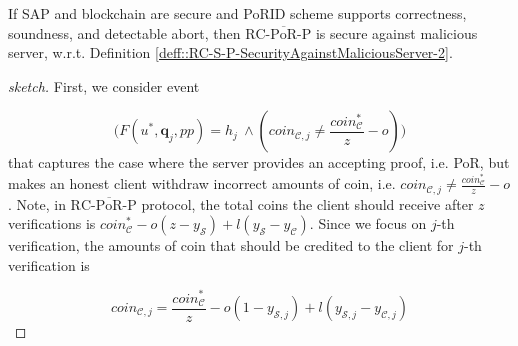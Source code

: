 
 \begin{lemma}
 If SAP and blockchain are secure and  PoRID scheme supports correctness, soundness, and detectable abort, then ${\text{RC-}\overline{\text{PoR}}\text{-P}}$ is secure against malicious server, w.r.t. Definition \ref{deff::RC-S-P-SecurityAgainstMaliciousServer-2}. 
 \end{lemma}
 

 \begin{proof}[sketch]
 First, we  consider event  
 
  $$\Big(F(u^{\scriptscriptstyle *}, \bm{q}_{\scriptscriptstyle j},{pp})= h_{\scriptscriptstyle j}\ \wedge (coin_{\scriptscriptstyle\mathcal{C},j}\neq  \frac{coin_{\scriptscriptstyle\mathcal C}^{\scriptscriptstyle*}}{z}-o)\Big)$$
   that captures the case where the server provides an accepting  proof, i.e. PoR, but makes an honest client withdraw  incorrect amounts of coin, i.e. $coin_{\scriptscriptstyle\mathcal{C},j}\neq  \frac{coin_{\scriptscriptstyle\mathcal C}^{\scriptscriptstyle*}}{z}-o$. Note, in ${\text{RC-}\overline{\text{PoR}}\text{-P}}$ protocol, the total coins the client should receive after $z$ verifications is   $coin^{\scriptscriptstyle *}_{\scriptscriptstyle\mathcal C}-o(z-y_{\scriptscriptstyle\mathcal S})+l(y_{\scriptscriptstyle\mathcal S}-y_{\scriptscriptstyle\mathcal C})$. Since we focus on  $j$-th verification, the amounts of  coin that should be credited to the client for $j$-th verification is
 
 
% 
  
  \begin{equation}\label{equ::what-client-recives-in-j-2}
   coin_{\scriptscriptstyle\mathcal{C},j}=\frac{coin^{\scriptscriptstyle *}_{\scriptscriptstyle\mathcal C}}{z}-o(1-y_{\scriptscriptstyle\mathcal {S},j})+l(y_{\scriptscriptstyle\mathcal {S},j}-y_{\scriptscriptstyle\mathcal {C},j})
     \end{equation}


\end{proof}
